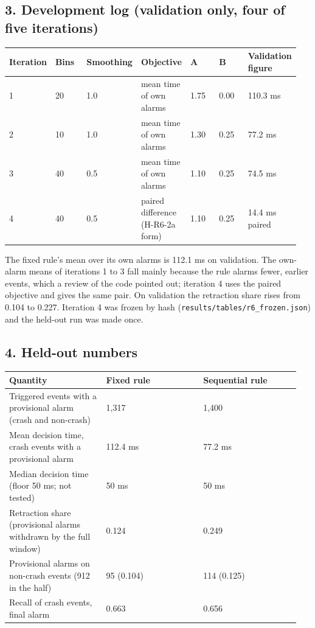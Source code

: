 \subsection*{3. Development log (validation only, four of five iterations)}

{\scriptsize\raggedright
\begin{longtable}{p{0.136\linewidth}p{0.136\linewidth}p{0.136\linewidth}p{0.136\linewidth}p{0.136\linewidth}p{0.136\linewidth}p{0.136\linewidth}}
\toprule
Iteration & Bins & Smoothing & Objective & A & B & Validation figure \\
\midrule
\endhead
1 & 20 & 1.0 & mean time of own alarms & 1.75 & 0.00 & 110.3 ms \\
2 & 10 & 1.0 & mean time of own alarms & 1.30 & 0.25 & 77.2 ms \\
3 & 40 & 0.5 & mean time of own alarms & 1.10 & 0.25 & 74.5 ms \\
4 & 40 & 0.5 & paired difference (H-R6-2a form) & 1.10 & 0.25 & 14.4 ms paired \\
\bottomrule
\end{longtable}}

The fixed rule's mean over its own alarms is 112.1 ms on validation. The own-alarm means of iterations 1 to 3 fall mainly because the rule alarms fewer, earlier events, which a review of the code pointed out; iteration 4 uses the paired objective and gives the same pair. On validation the retraction share rises from 0.104 to 0.227. Iteration 4 was frozen by hash (\texttt{results/tables/r6\_frozen.json}) and the held-out run was made once.

\subsection*{4. Held-out numbers}

{\scriptsize\raggedright
\begin{longtable}{p{0.317\linewidth}p{0.317\linewidth}p{0.317\linewidth}}
\toprule
Quantity & Fixed rule & Sequential rule \\
\midrule
\endhead
Triggered events with a provisional alarm (crash and non-crash) & 1,317 & 1,400 \\
Mean decision time, crash events with a provisional alarm & 112.4 ms & 77.2 ms \\
Median decision time (floor 50 ms; not tested) & 50 ms & 50 ms \\
Retraction share (provisional alarms withdrawn by the full window) & 0.124 & 0.249 \\
Provisional alarms on non-crash events (912 in the half) & 95 (0.104) & 114 (0.125) \\
Recall of crash events, final alarm & 0.663 & 0.656 \\
\bottomrule
\end{longtable}}

